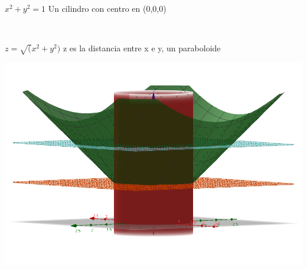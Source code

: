 \documentclass[../practica_02.tex]{subfiles}
\begin{document}
    $x^2 + y^2 = 1$ Un cilindro con centro en (0,0,0)

    $ $

    $z = \sqrt(x^2 + y^2)$ z es la distancia entre x e y, un paraboloide

    \includegraphics[scale=0.4]{ej08/resources/1.png} $ $
\end{document}
